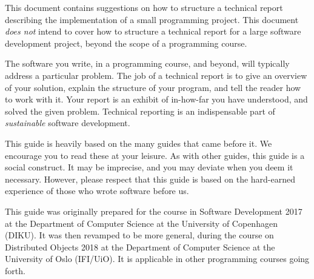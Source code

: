 This document contains suggestions on how to structure a technical
report describing the implementation of a small programming project.
This document \emph{does not} intend to cover how to structure a
technical report for a large software development project, beyond the
scope of a programming course.

\medskip

The software you write, in a programming course, and beyond, will
typically address a particular problem. The job of a technical report
is to give an overview of your solution, explain the structure of your
program, and tell the reader how to work with it. Your report is an
exhibit of in-how-far you have understood, and solved the given
problem. Technical reporting is an indispensable part of
\emph{sustainable} software development.

\medskip

This guide is heavily based on the many guides that came before
it\cite{sestoft2002, foerstehjaelp2005, julegave1996, kunst2007}. We
encourage you to read these at your leisure. As with other guides,
this guide is a social construct.  It may be imprecise, and you may
deviate when you deem it necessary.  However, please respect that this
guide is based on the hard-earned experience of those who wrote
software before us.

This guide was originally prepared for the course in Software
Development 2017 at the Department of Computer Science at the
University of Copenhagen (DIKU). It was then revamped to be more
general, during the course on Distributed Objects 2018 at the
Department of Computer Science at the University of Oslo (IFI/UiO). It
is applicable in other programming courses going forth.
